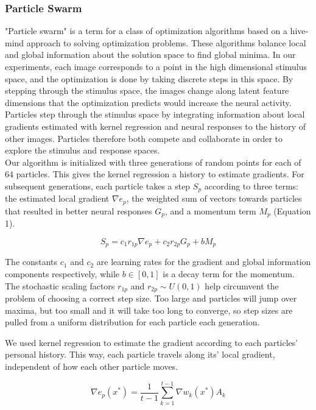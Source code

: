  
\subsubsection*{Particle Swarm}
"Particle swarm" is a term for a class of optimization algorithms based on a hive-mind approach to solving optimization problems. These algorithms balance local and global information about the solution space to find global minima. In our experiments, each image corresponds to a point in the high dimensional stimulus space, and the optimization is done by taking discrete steps in this space. By stepping through the stimulus space, the images change along latent feature dimensions that the optimization predicts would increase the neural activity. Particles step through the stimulus space by integrating information about local gradients estimated with kernel regression and neural responses to the history of other images. Particles therefore both compete and collaborate in order to explore the stimulus and response spaces. \\
Our algorithm is initialized with three generations of random points for each of 64 particles. This gives the kernel regression a history to estimate gradients. For subsequent generations, each particle takes a step $S_p$ according to three terms: the estimated local gradient $\nabla e_p$,  the weighted sum of vectors towards particles that resulted in better neural responses $G_p$, and a momentum term $M_p$ (Equation 1).

\begin{equation}
	S_p= c_1 r_{1p} \nabla e_p+ c_2  r_{2p} G_p+b M_p
\end{equation}

The constants $c_1$ and $c_2$ are learning rates for the gradient and global information components respectively, while $b \in [0,1]$ is a decay term for the momentum. The stochastic scaling factors $r_{1p}$ and $r_{2p} \sim U(0,1)$ help circumvent the problem of choosing a correct step size. Too large and particles will jump over maxima, but too small and it will take too long to converge, so step sizes are pulled from a uniform distribution for each particle each generation.

We used kernel regression to estimate the gradient according to each particles’ personal history. This way, each particle travels along its' local gradient, independent of how each other particle moves. 

\begin{equation}
	\nabla e_p (x^* )=\frac{1}{t-1} \sum_{k=1}^{t-1} \nabla w_k (x^* )  A_k
\end{equation}

